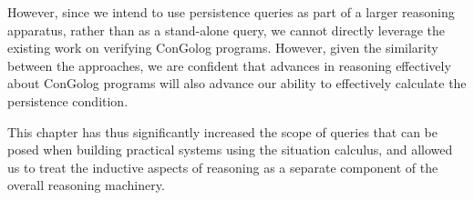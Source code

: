 However, since we intend to use persistence queries as part of a larger
reasoning apparatus, rather than as a stand-alone query, we cannot
directly leverage the existing work on verifying ConGolog programs.
However, given the similarity between the approaches, we are confident
that advances in reasoning effectively about ConGolog programs will
also advance our ability to effectively calculate the persistence
condition.

This chapter has thus significantly increased the scope of queries
that can be posed when building practical systems using the situation
calculus, and allowed us to treat the inductive aspects of reasoning
as a separate component of the overall reasoning machinery.

